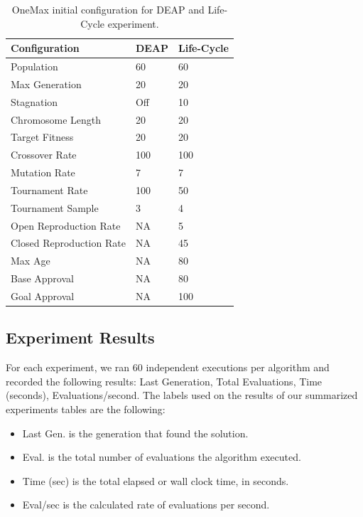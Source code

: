 \documentclass[graybox]{svmult}
\begin{document}
\begin{table}[]
    \centering        
    \caption{OneMax initial configuration for DEAP and Life-Cycle experiment.}\label{tab.configuration}
    \begin{tabular}{|l|l|l|}
    \hline
    \textbf{Configuration} & \textbf{DEAP} & \textbf{Life-Cycle} \\ \hline
    Population & 60 & 60 \\ \hline
    Max Generation & 20 & 20 \\ \hline
    Stagnation & Off & 10 \\ \hline
    Chromosome Length & 20 & 20 \\ \hline
    Target Fitness & 20 & 20 \\ \hline
    Crossover Rate & 100 & 100 \\ \hline
    Mutation Rate & 7 & 7 \\ \hline
    Tournament Rate & 100 & 50 \\ \hline
    Tournament Sample & 3 & 4 \\ \hline
    Open Reproduction Rate & NA & 5 \\ \hline
    Closed Reproduction Rate & NA & 45 \\ \hline
    Max Age & NA & 80 \\ \hline
    Base Approval & NA & 80 \\ \hline
    Goal Approval & NA & 100 \\ \hline
    \end{tabular}
    \end{table}


\subsection{Experiment Results}

For each experiment, we ran 60 independent executions per algorithm and
recorded the following results: Last Generation, Total Evaluations, Time
(seconds), Evaluations/second. The labels used on the results of our summarized
experiments tables are the following:

\begin{itemize}
    \item   Last Gen.   is the generation that found the solution.
    \item   Eval.       is the total number of evaluations the algorithm executed. 
    \item   Time (sec)  is the total elapsed or wall clock time, in seconds. 
    \item   Eval/sec    is the calculated rate of evaluations per second.
\end{itemize}
\end{document}
